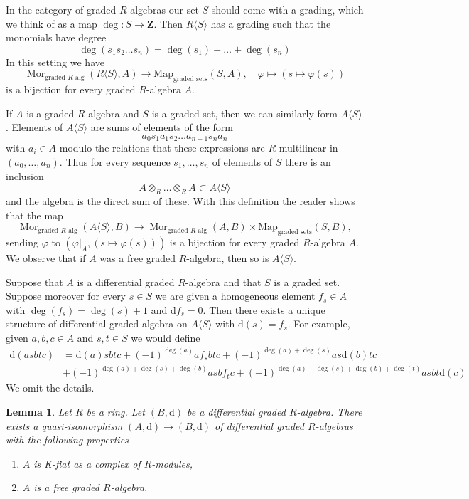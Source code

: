 \documentclass{stacks-project}
\theoremstyle{plain}
\newtheorem{lemma}[subsection]{Lemma}
\theoremstyle{definition}
\theoremstyle{remark}
\numberwithin{equation}{subsection}
\def\Mor{\mathop{\mathrm{Mor}}\nolimits}
\begin{document}
\medskip\noindent
In the category of graded $R$-algebras our set $S$ should come
with a grading, which we think of as a map $\deg : S \to \mathbf{Z}$.
Then $R\langle S\rangle$ has a grading such that the monomials
have degree
$$
\deg(s_1 s_2 \ldots s_n) = \deg(s_1) + \ldots + \deg(s_n)
$$
In this setting we have
$$
\Mor_{\text{graded }R\text{-alg}}(R\langle S \rangle, A) \to
\text{Map}_{\text{graded sets}}(S, A),\quad
\varphi \longmapsto (s \mapsto \varphi(s))
$$
is a bijection for every graded $R$-algebra $A$.

\medskip\noindent
If $A$ is a graded $R$-algebra and $S$ is a graded set,
then we can similarly form $A\langle S \rangle$.
Elements of $A\langle S \rangle$ are
sums of elements of the form
$$
a_0 s_1 a_1 s_2 \ldots a_{n - 1} s_n a_n
$$
with $a_i \in A$ modulo the relations that these expressions
are $R$-multilinear in $(a_0, \ldots, a_n)$.
Thus for every sequence $s_1, \ldots, s_n$ of elements of $S$
there is an inclusion
$$
A \otimes_R \ldots \otimes_R A \subset A\langle S \rangle
$$
and the algebra is the direct sum of these. With this definition the
reader shows that the map
$$
\Mor_{\text{graded }R\text{-alg}}(A\langle S \rangle, B) \to
\Mor_{\text{graded }R\text{-alg}}(A, B) \times
\text{Map}_{\text{graded sets}}(S, B),
$$
sending $\varphi$ to $(\varphi|_A, (s \mapsto \varphi(s)))$
is a bijection for every graded $R$-algebra $A$.
We observe that if $A$ was a free graded $R$-algebra,
then so is $A\langle S \rangle$.

\medskip\noindent
Suppose that $A$ is a differential graded $R$-algebra and
that $S$ is a graded set. Suppose moreover for every $s \in S$
we are given a homogeneous element $f_s \in A$ with $\deg(f_s) = \deg(s) + 1$
and $\text{d}f_s = 0$. Then there exists a unique structure of
differential graded algebra on $A\langle S \rangle$ with
$\text{d}(s) = f_s$. For example, given $a, b, c \in A$ and
$s, t \in S$ we would define
\begin{align*}
\text{d}(asbtc)
& =
\text{d}(a)sbtc + (-1)^{\deg(a)}a f_s b t c +
(-1)^{\deg(a) + \deg(s)} as\text{d}(b)tc \\
& + (-1)^{\deg(a) + \deg(s) + \deg(b)} asb f_t c +
(-1)^{\deg(a) + \deg(s) + \deg(b) + \deg(t)} asbt\text{d}(c)
\end{align*}
We omit the details.

\begin{lemma}
\label{lemma-K-flat-resolution}
Let $R$ be a ring. Let $(B, \text{d})$ be a differential graded $R$-algebra.
There exists a quasi-isomorphism $(A, \text{d}) \to (B, \text{d})$ of
differential graded $R$-algebras with the following properties
\begin{enumerate}
\item $A$ is K-flat as a complex of $R$-modules,
\item $A$ is a free graded $R$-algebra.
\end{enumerate}
\end{lemma}
\end{document}
